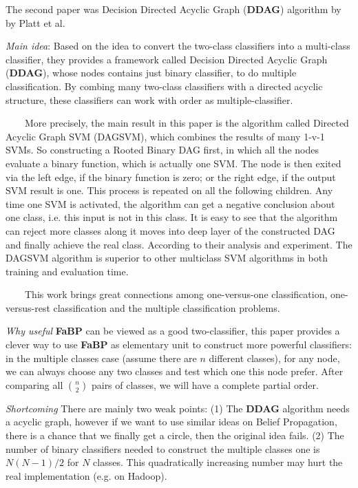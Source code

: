 The second paper was Decision Directed Acyclic Graph (\textbf{DDAG}) algorithm by by Platt et al.
\cite{Platt00largemargin}
\begin{itemize*}
\item {\em Main idea}:
Based on the idea to convert the two-class classifiers into a multi-class classifier, they provides a framework called Decision Directed Acyclic Graph (\textbf{DDAG}), whose nodes contains just binary classifier, to do multiple classification. By combing many two-class classifiers with a directed acyclic structure, these classifiers can work with order as multiple-classifier.

~~~~More precisely, the main result in this paper is the algorithm called Directed Acyclic Graph SVM (DAGSVM), which combines the results of many 1-v-1 SVMs. So constructing a Rooted Binary DAG first, in which all the nodes evaluate a binary function, which is actually one SVM. The node is then exited via the left edge, if the binary function is zero; or the right edge, if the output SVM result is one. This process is repeated on all the following children. Any time one SVM is activated, the algorithm can get a negative conclusion about one class, i.e. this input is not in this class. It is easy to see that the algorithm can reject more classes along it moves into deep layer of the constructed DAG and finally achieve the real class. According to their analysis and experiment. The DAGSVM algorithm is superior to other multiclass SVM algorithms in both training and evaluation time.

~~~~This work brings great connections among one-versus-one classification, one-versus-rest classification and the multiple classification problems.

\item{\em Why useful}
 \textbf{FaBP} can be viewed as a good two-classifier, this paper provides a clever way to use \textbf{FaBP} as elementary unit to construct more powerful classifiers: in the multiple classes case (assume there are $n$ different classes), for any node, we can always choose any two classes and test which one this node prefer. After comparing all $n \choose 2$ pairs of classes, we will have a complete partial order.

\item{\em Shortcoming}
There are mainly two weak points: (1) The \textbf{DDAG} algorithm needs a acyclic graph, however if we want to use similar ideas on Belief Propagation, there is a chance that we finally get a circle, then the original idea fails. (2) The number of binary classifiers needed to construct the multiple classes one is $N(N-1)/2$ for $N$ classes. This quadratically increasing number may hurt the real implementation (e.g. on Hadoop).
\end{itemize*}


